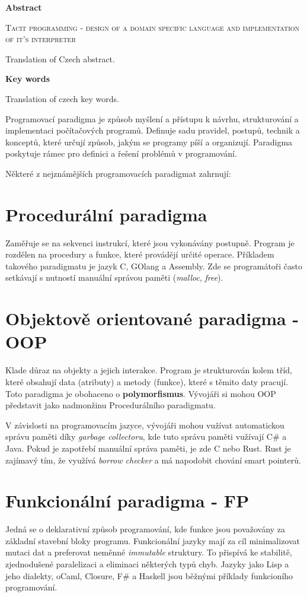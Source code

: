 \documentclass[male,czech]{kithesis}
\newcommand{\TITULen}{Tacit programming - design of a domain specific language and implementation of it's interpreter} %
\begin{document}
\textbf{\textsf{Abstract}}

\textsc{\TITULen}

Translation of Czech abstract.

\textbf{\textsf{Key words}}

Translation of czech key words.

\tableofcontents


Programovací paradigma je způsob myšlení a přístupu k návrhu, 
strukturování a implementaci počítačových programů. 
Definuje sadu pravidel, postupů, technik a konceptů, které určují způsob,
jakým se programy píší a organizují. Paradigma poskytuje rámec pro definici a 
řešení problémů v programování.

Některé z nejznámějších programovacích paradigmat zahrnují:

\section{Procedurální paradigma}
Zaměřuje se na sekvenci instrukcí, 
které jsou vykonávány postupně. 
Program je rozdělen na procedury a funkce, které provádějí určité operace. Příkladem takového 
paradigmatu je jazyk C, GOlang a Assembly. Zde se programátoři často setkávají s nutností
manuální správou paměti (\textit{malloc}, \textit{free}).

\section{Objektově orientované paradigma - OOP}
Klade důraz na objekty a jejich interakce. 
Program je strukturován kolem tříd, které obsahují data (atributy) a metody (funkce), 
které s těmito daty pracují. Toto paradigma je obohaceno o \textbf{polymorfismus}.
Vývojáři si mohou OOP představit jako nadmonžinu Procedurálního paradigmatu.

V závislosti na programovacím jazyce, 
vývojáři mohou vužívat automatickou správu paměti díky \textit{garbage collectoru}, kde 
tuto správu paměti vužívají C\# a Java. Pokud je zapotřebí manuální správa paměti, je zde
C\+\+ nebo Rust. Rust je zajímavý tím, že využívá \textit{borrow checker} a má napodobit
chování smart pointerů.


\section{Funkcionální paradigma - FP}
Jedná se o deklarativní způsob programování, kde funkce jsou 
považovány za základní stavební bloky programu. 
Funkcionální jazyky mají za cíl minimalizovat mutaci dat a preferovat neměnné \textit{immutable}
struktury. 
To přispívá ke stabilitě, zjednodušené paralelizaci a eliminaci některých typů chyb. 
Jazyky jako Lisp a jeho dialekty, oCaml, Closure, F\# a Haskell 
jsou běžnými příklady funkcioního programování.
\end{document}
